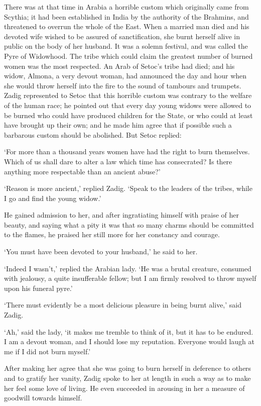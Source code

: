 \documentclass{article}
\begin{document}
\begin{center}
There was at that time in Arabia a horrible custom which originally came from Scythia; 
it had been established in India by the authority of the Brahmins, and threatened 
to overrun the whole of the East. When a married man died and his devoted wife 
wished to be assured of sanctification, she burnt herself alive in public on the 
body of her husband. It was a solemn festival, and was called the Pyre of Widowhood. 
The tribe which could claim the greatest number of burned women was the most respected. 
An Arab of Setoc's tribe had died; and his widow, Almona, a very devout woman, 
had announced the day and hour when she would throw herself into the fire to the 
sound of tambours and trumpets. Zadig represented to Setoc that this horrible custom 
was contrary to the welfare of the human race; he pointed out that every day young 
widows were allowed to be burned who could have produced children for the State, 
or who could at least have brought up their own; and he made him agree that if 
possible such a barbarous custom should be abolished. But Setoc replied: 

`For more than a thousand years women have had the right to burn themselves. Which 
of us shall dare to alter a law which time has consecrated? Is there anything more 
respectable than an ancient abuse?' 

`Reason is more ancient,' replied Zadig. `Speak to the leaders of the tribes, while 
I go and find the young widow.' 

He gained admission to her, and after ingratiating himself with praise of her beauty, 
and saying what a pity it was that so many charms should be committed to the flames, 
he praised her still more for her constancy and courage. 

`You must have been devoted to your husband,' he said to her. 

`Indeed I wasn't,' replied the Arabian lady. `He was a brutal creature, consumed 
with jealousy, a quite insufferable fellow; but I am firmly resolved to throw myself 
upon his funeral pyre.' 

`There must evidently be a most delicious pleasure in being burnt alive,' said 
Zadig. 

`Ah,' said the lady, `it makes me tremble to think of it, but it has to be endured. 
I am a devout woman, and I should lose my reputation. Everyone would laugh at me 
if I did not burn myself.' 

After making her agree that she was going to burn herself in deference to others 
and to gratify her vanity, Zadig spoke to her at length in such a way as to make 
her feel some love of living. He even succeeded in arousing in her a measure of 
goodwill towards himself. 


\end{center}
\end{document}
